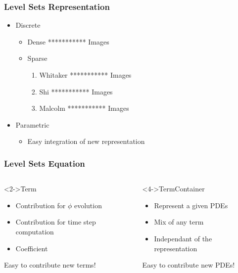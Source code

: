 \documentclass[18pt]{beamer}
\begin{document}
\begin{frame}
\frametitle{Level Sets Representation}
\begin{itemize}
  \item Discrete
  \begin{itemize}
    \item Dense     *********** Images
    \item Sparse 
    \begin{enumerate}
      \item Whitaker  *********** Images 
      \item Shi       *********** Images 
      \item Malcolm   *********** Images 
    \end{enumerate}
  \end{itemize}
  \item Parametric
  \begin{itemize}
    \item Easy integration of new representation
  \end{itemize}
\end{itemize}
\end{frame}


\begin{frame}
\frametitle{Level Sets Equation}

\begin{columns}
  \begin{block}<2->{Term}
    \begin{itemize}
      \item Contribution for $\phi$ evolution
      \item Contribution for time step computation
      \item Coefficient
    \end{itemize} 
  \alert<3->{Easy to contribute new terms!}
  \end{block}

  \begin{block}<4->{TermContainer}
    \begin{itemize}
      \item Represent a given PDEs
      \item Mix of any term
      \item Independant of the representation
    \end{itemize}
  \alert<5->{Easy to contribute new PDEs!}
  \end{block}

\end{columns}

\end{frame}
\end{document}

